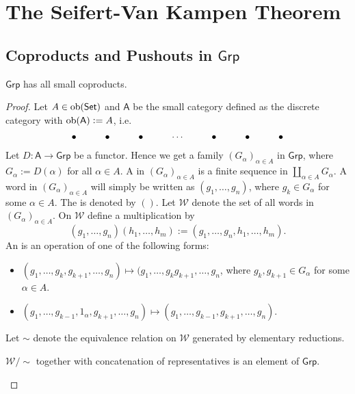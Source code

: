 \section*{The Seifert-Van Kampen Theorem}
\subsection*{Coproducts and Pushouts in $\mathsf{Grp}$}

\begin{proposition}
	$\mathsf{Grp}$ has all small coproducts.
	\label{prop:coproducts_grp}
\end{proposition}

\begin{proof}
	Let $A \in \operatorname{ob}(\mathsf{Set})$ and $\mathsf{A}$ be the small category defined as the discrete category with $\operatorname{ob}(\mathsf{A}) := A$, i.e.
	\begin{equation*}
		\xymatrix{
			\bullet & \bullet & \bullet & \cdots & \bullet & \bullet & \bullet
		}
	\end{equation*}	
	Let $D : \mathsf{A} \to \mathsf{Grp}$ be a functor. Hence we get a family $(G_\alpha)_{\alpha \in A}$ in $\mathsf{Grp}$, where $G_\alpha := D(\alpha)$ for all $\alpha \in A$. A  in $(G_\alpha)_{\alpha \in A}$ is a finite sequence in $\coprod_{\alpha \in A}G_\alpha$. A word in $(G_\alpha)_{\alpha \in A}$ will simply be written as $(g_1,\dots, g_n)$, where $g_k \in G_\alpha$ for some $\alpha \in A$. The  is denoted by $()$. Let $\mathcal{W}$ denote the set of all words in $(G_\alpha)_{\alpha \in A}$. On $\mathcal{W}$ define a multiplication by 
	\begin{equation*}
		(g_1,\dots, g_n)(h_1,\dots, h_m) := (g_1, \dots, g_n,h_1, \dots, h_m).
	\end{equation*}
	An  is an operation of one of the following forms:
	\begin{itemize}[leftmargin = *]
		\item $(g_1, \dots ,g_k,g_{k + 1}, \dots, g_n) \mapsto (g_1,\dots,g_kg_{k + 1},\dots,g_n $, where $g_k,g_{k + 1} \in G_\alpha$ for some $\alpha \in A$.
		\item $(g_1,\dots,g_{k - 1},1_\alpha,g_{k + 1},\dots,g_n) \mapsto (g_1,\dots,g_{k - 1},g_{k + 1},\dots,g_n)$.
	\end{itemize}
	Let $\sim$ denote the equivalence relation on $\mathcal{W}$ generated by elementary reductions. 
	
	\begin{lemma}
		$\mathcal{W}/{\sim}$ together with concatenation of representatives is an element of $\mathsf{Grp}$.
		\label{lem:free_product}
	\end{lemma}


\end{proof}
